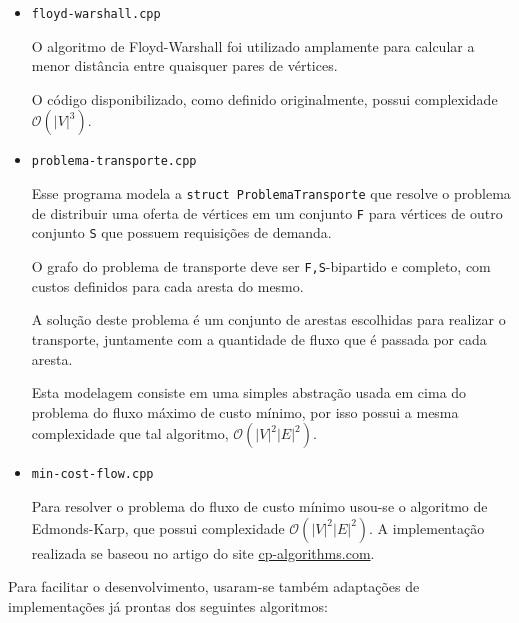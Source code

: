 \begin{itemize}
    \item \texttt{floyd-warshall.cpp}

        O algoritmo de Floyd-Warshall foi utilizado amplamente para calcular a menor distância entre quaisquer pares de vértices.

        O código disponibilizado, como definido originalmente, possui complexidade $\mathcal{O}(|V|^3)$.

    \item \texttt{problema-transporte.cpp}

        Esse programa modela a \texttt{struct ProblemaTransporte} que resolve o problema de distribuir uma oferta de vértices em um conjunto  \texttt{F} para vértices de outro conjunto \texttt{S} que possuem requisições de demanda.

        O grafo do problema de transporte deve ser \texttt{F,S}-bipartido e completo, com custos definidos para cada aresta do mesmo.

        A solução deste problema é um conjunto de arestas escolhidas para realizar o transporte, juntamente com a quantidade de fluxo que é passada por cada aresta.

        Esta modelagem consiste em uma simples abstração usada em cima do problema do fluxo máximo de custo mínimo, por isso possui a mesma complexidade que tal algoritmo, $\mathcal{O}(|V|^2 |E|^2)$.
        
    \item \texttt{min-cost-flow.cpp}

        Para resolver o problema do fluxo de custo mínimo usou-se o algoritmo de Edmonds-Karp, que possui complexidade $\mathcal{O}(|V|^2 |E|^2)$.
        A implementação realizada se baseou no artigo \cite{min-cost} do site \href{https://cp-algorithms.com/}{cp-algorithms.com}.
        
\end{itemize}

Para facilitar o desenvolvimento, usaram-se também adaptações de implementações já prontas dos seguintes algoritmos:

